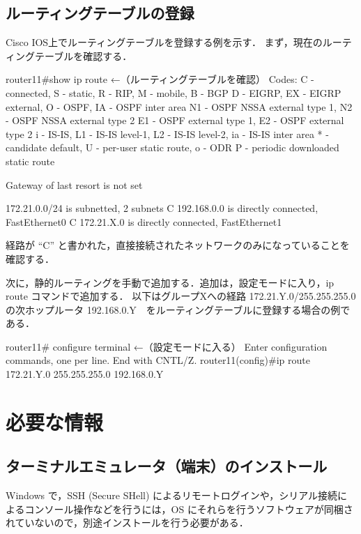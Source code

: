 \subsection{ルーティングテーブルの登録}
Cisco IOS上でルーティングテーブルを登録する例を示す．
まず，現在のルーティングテーブルを確認する．

\begin{cli}
router11#show ip route                                    ←（ルーティングテーブルを確認）
Codes: C - connected, S - static, R - RIP, M - mobile, B - BGP
       D - EIGRP, EX - EIGRP external, O - OSPF, IA - OSPF inter area
       N1 - OSPF NSSA external type 1, N2 - OSPF NSSA external type 2
       E1 - OSPF external type 1, E2 - OSPF external type 2
       i - IS-IS, L1 - IS-IS level-1, L2 - IS-IS level-2, ia - IS-IS inter area
       * - candidate default, U - per-user static route, o - ODR
       P - periodic downloaded static route

Gateway of last resort is not set

     172.21.0.0/24 is subnetted, 2 subnets
C       192.168.0.0 is directly connected, FastEthernet0
C       172.21.X.0 is directly connected, FastEthernet1
\end{cli}

経路が ``C'' と書かれた，直接接続されたネットワークのみになっていることを確認する．

次に，静的ルーティングを手動で追加する．追加は，設定モードに入り，ip route コマンドで追加する．
以下はグループXへの経路 172.21.Y.0/255.255.255.0 の次ホップルータ 
192.168.0.Y　をルーティングテーブルに登録する場合の例である．
\begin{cli}
router11# configure terminal                              ←（設定モードに入る）
Enter configuration commands, one per line.  End with CNTL/Z.
router11(config)#ip route 172.21.Y.0 255.255.255.0 192.168.0.Y
\end{cli}

\section{必要な情報}

\subsection{ターミナルエミュレータ（端末）のインストール}

Windows で，SSH (Secure SHell) によるリモートログインや，シリアル接続に
よるコンソール操作などを行うには，OS にそれらを行うソフトウェアが同梱さ
れていないので，別途インストールを行う必要がある．

